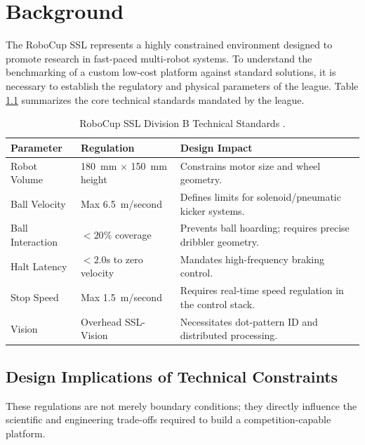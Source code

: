 \documentclass[a4paper,twoside,12pt]{report}
\begin{document}
\chapter{Background}\label{chapter: background}

The RoboCup SSL represents a highly constrained environment designed to promote research in fast-paced multi-robot systems. To understand the benchmarking of a custom low-cost platform against standard solutions, it is necessary to establish the regulatory and physical parameters of the league. Table \ref{tab:ssl_rules} summarizes the core technical standards mandated by the league.

\begin{table}[H]
    \centering
    \caption{RoboCup SSL Division B Technical Standards \citep{ssl_rules_2026}.}
    \label{tab:ssl_rules}
    \begin{tabularx}{\textwidth}{l l X}
        \toprule
        \textbf{Parameter} & \textbf{Regulation} & \textbf{Design Impact} \\
        \midrule
        Robot Volume & \SI{180}{\mm} $\times$ \SI{150}{\mm} height & Constrains motor size and wheel geometry. \\
        Ball Velocity & Max \SI{6.5}{\meter/second} & Defines limits for solenoid/pneumatic kicker systems. \\
        Ball Interaction & $< 20\%$ coverage & Prevents ball hoarding; requires precise dribbler geometry. \\
        Halt Latency & $< 2.0\text{s}$ to zero velocity & Mandates high-frequency braking control. \\
        Stop Speed & Max \SI{1.5}{\meter/second} & Requires real-time speed regulation in the control stack. \\
        Vision & Overhead SSL-Vision & Necessitates dot-pattern ID and distributed processing. \\
        \bottomrule
    \end{tabularx}
\end{table}

\section{Design Implications of Technical Constraints}

These regulations are not merely boundary conditions; they directly influence the scientific and engineering trade-offs required to build a competition-capable platform.
\end{document}
